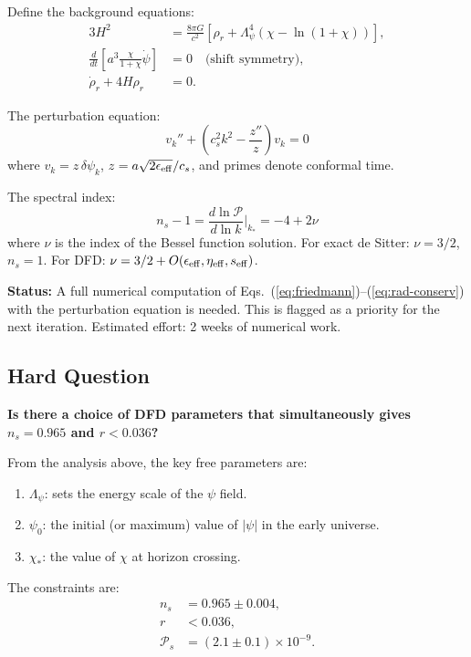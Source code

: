 \documentclass[11pt,a4paper]{article}
\begin{document}
Define the background equations:
\begin{align}
3H^2 &= \frac{8\pi G}{c^2}\left[\rho_r + \Lambda_\psi^4(\chi - \ln(1+\chi))\right], \label{eq:friedmann} \\
\frac{d}{dt}\left[a^3\frac{\chi}{1+\chi}\dot\psi\right] &= 0 \quad \text{(shift symmetry)}, \label{eq:psi-eom} \\
\dot\rho_r + 4H\rho_r &= 0. \label{eq:rad-conserv}
\end{align}

The perturbation equation:
\begin{equation}
v_k'' + \left(c_s^2 k^2 - \frac{z''}{z}\right)v_k = 0
\end{equation}
where $v_k = z\,\delta\psi_k$, $z = a\sqrt{2\epsilon_{\rm eff}}/c_s$, and primes denote conformal time.

The spectral index:
\begin{equation}
n_s - 1 = \frac{d\ln\mathcal{P}}{d\ln k}\bigg|_{k_*} = -4 + 2\nu
\end{equation}
where $\nu$ is the index of the Bessel function solution. For exact de Sitter: $\nu = 3/2$, $n_s = 1$. For DFD: $\nu = 3/2 + O(\epsilon_{\rm eff}, \eta_{\rm eff}, s_{\rm eff})$.

\textbf{Status:} A full numerical computation of Eqs.\ (\ref{eq:friedmann})--(\ref{eq:rad-conserv}) with the perturbation equation is needed. This is flagged as a priority for the next iteration. Estimated effort: 2 weeks of numerical work.

\subsection{Hard Question}

\textbf{Is there a choice of DFD parameters that simultaneously gives $n_s = 0.965$ and $r < 0.036$?}

From the analysis above, the key free parameters are:
\begin{enumerate}
\item $\Lambda_\psi$: sets the energy scale of the $\psi$ field.
\item $\psi_0$: the initial (or maximum) value of $|\psi|$ in the early universe.
\item $\chi_*$: the value of $\chi$ at horizon crossing.
\end{enumerate}

The constraints are:
\begin{align}
n_s &= 0.965 \pm 0.004, \\
r &< 0.036, \\
\mathcal{P}_s &= (2.1 \pm 0.1) \times 10^{-9}.
\end{align}
\end{document}
